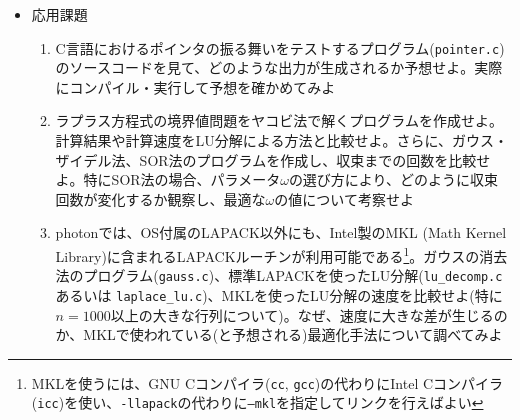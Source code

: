 \documentclass[11pt]{jarticle}
\begin{document}
\begin{itemize}
\item 応用課題
  \begin{enumerate}
  \item C言語におけるポインタの振る舞いをテストするプログラム({\tt pointer.c})のソースコードを見て、どのような出力が生成されるか予想せよ。実際にコンパイル・実行して予想を確かめてみよ
  \item ラプラス方程式の境界値問題をヤコビ法で解くプログラムを作成せよ。計算結果や計算速度をLU分解による方法と比較せよ。さらに、ガウス・ザイデル法、SOR法のプログラムを作成し、収束までの回数を比較せよ。特にSOR法の場合、パラメータ$\omega$の選び方により、どのように収束回数が変化するか観察し、最適な$\omega$の値について考察せよ
  \item photonでは、OS付属のLAPACK以外にも、Intel製のMKL (Math Kernel Library)に含まれるLAPACKルーチンが利用可能である\footnote{MKLを使うには、GNU Cコンパイラ({\tt cc}, {\tt gcc})の代わりにIntel Cコンパイラ({\tt icc})を使い、{\tt -llapack}の代わりに{\tt --mkl}を指定してリンクを行えばよい}。ガウスの消去法のプログラム({\tt gauss.c})、標準LAPACKを使ったLU分解({\tt lu\_decomp.c} あるいは {\tt laplace\_lu.c})、MKLを使ったLU分解の速度を比較せよ(特に$n=1000$以上の大きな行列について)。なぜ、速度に大きな差が生じるのか、MKLで使われている(と予想される)最適化手法について調べてみよ
  \end{enumerate}  
\end{itemize}
\end{document}
